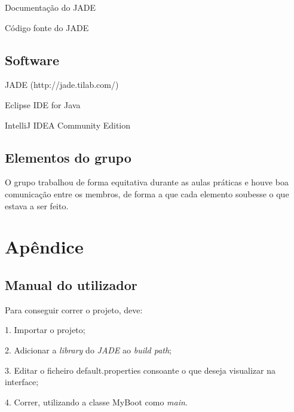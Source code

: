 \documentclass[a4paper]{article}
\begin{document}
Documentação do JADE

Código fonte do JADE

\subsection{Software} 

JADE (http://jade.tilab.com/)

Eclipse IDE for Java

IntelliJ IDEA Community Edition

\subsection{Elementos do grupo}

O grupo trabalhou de forma equitativa durante as aulas práticas e houve boa comunicação entre os membros, de forma a que cada elemento soubesse o que estava a ser feito.

\section{Apêndice}

\subsection{Manual do utilizador} 

Para conseguir correr o projeto, deve:

1. Importar o projeto;

2. Adicionar a \textit{library} do \textit{JADE} ao \textit{build path};

3. Editar o ficheiro default.properties consoante o que deseja visualizar na interface;

4. Correr, utilizando a classe MyBoot como \textit{main}.

\newpage

\end{document}
